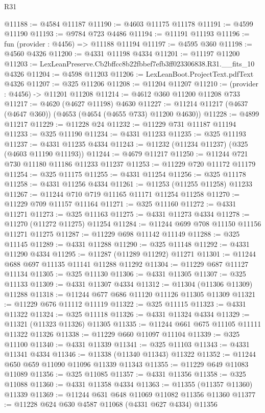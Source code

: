\begin{lexlean}{R31}
\begin{coremodule}
@11188 := @4584 @11187
@11190 := @4603 @11175 @11178
@11191 := @4599 @11190
@11193 := @9784 @723 @4486
@11194 := @11191 @11193
@11196 := fun (provider : @4456) => @11188 @11194
@11197 := @4595 @360
@11198 := @4560 @4326
@11200 := @4331 @11198 @4334
@11201 := @11197 @11200
@11203 := LexLeanPreserve.Cb2bffcc8b22fbbef7efb3ff023306838.R31.__fits_10 @4326
@11204 := @4598 @11203
@11206 := LexLeanBoot.ProjectText.pdfText @4326
@11207 := @325 @11206
@11208 := @11204 @11207
@11210 := (provider : @4456) -> @11201 @11208
@11214 := @4612 @360 @11200 @11208 @733
@11217 := @4620 (@4627 @11198) @4630
@11227 := @11214 @11217 (@4637 (@4647 @360)) (@4653 (@4654 (@4655 @733) @11200 @4630))
@11228 := @4899 @11217
@11229 := @11228 @24
@11232 := @11229 @731 @11187 @11194
@11233 := @325 @11190
@11234 := @4331 @11233
@11235 := @325 @11193
@11237 := @4331 @11235 @4334
@11243 := @11232 (@11234 @11237) (@325 (@4603 @11190 @11193))
@11244 := @4679 @11217
@11250 := @11244 @721 @730 @11180 @11186 @11233 @11237
@11253 := @11229 @720 @11172 @11179
@11254 := @325 @11175
@11255 := @4331 @11254
@11256 := @325 @11178
@11258 := @4331 @11256 @4334
@11261 := @11253 (@11255 @11258) @11233
@11267 := @11244 @710 @719 @11165 @11171 @11254 @11258
@11270 := @11229 @709 @11157 @11164
@11271 := @325 @11160
@11272 := @4331 @11271
@11273 := @325 @11163
@11275 := @4331 @11273 @4334
@11278 := @11270 (@11272 @11275) @11254
@11284 := @11244 @699 @708 @11150 @11156 @11271 @11275
@11287 := @11229 @698 @11142 @11149
@11288 := @325 @11145
@11289 := @4331 @11288
@11290 := @325 @11148
@11292 := @4331 @11290 @4334
@11295 := @11287 (@11289 @11292) @11271
@11301 := @11244 @688 @697 @11135 @11141 @11288 @11292
@11304 := @11229 @687 @11127 @11134
@11305 := @325 @11130
@11306 := @4331 @11305
@11307 := @325 @11133
@11309 := @4331 @11307 @4334
@11312 := @11304 (@11306 @11309) @11288
@11318 := @11244 @677 @686 @11120 @11126 @11305 @11309
@11321 := @11229 @676 @11112 @11119
@11322 := @325 @11115
@11323 := @4331 @11322
@11324 := @325 @11118
@11326 := @4331 @11324 @4334
@11329 := @11321 (@11323 @11326) @11305
@11335 := @11244 @661 @675 @11105 @11111 @11322 @11326
@11338 := @11229 @660 @11097 @11104
@11339 := @325 @11100
@11340 := @4331 @11339
@11341 := @325 @11103
@11343 := @4331 @11341 @4334
@11346 := @11338 (@11340 @11343) @11322
@11352 := @11244 @650 @659 @11090 @11096 @11339 @11343
@11355 := @11229 @649 @11083 @11089
@11356 := @325 @11085
@11357 := @4331 @11356
@11358 := @325 @11088
@11360 := @4331 @11358 @4334
@11363 := @11355 (@11357 @11360) @11339
@11369 := @11244 @631 @648 @11069 @11082 @11356 @11360
@11377 := @11228 @624 @630 @4587 @11068 (@4331 @627 @4334) @11356

\end{coremodule}
\end{lexlean}
